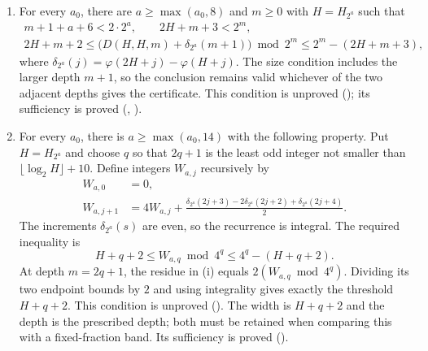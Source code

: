 \begin{enumerate}
\item[(i)] For every $a_0$, there are $a\ge\max(a_0,8)$ and $m\ge0$
with $H=H_{2^a}$ such that
\[
\begin{gathered}
 m+1+a+6<2\cdot2^a,\qquad 2H+m+3<2^m,\\
 2H+m+2\le
 \bigl(D(H,H,m)+\delta_{2^a}(m+1)\bigr)\bmod2^m
 \le2^m-(2H+m+3),
\end{gathered}
\]
where $\delta_{2^a}(j)=\varphi(2H+j)-\varphi(H+j)$.
The size condition includes the larger depth $m+1$, so the conclusion
remains valid whichever of the two adjacent depths gives the certificate.
This condition is unproved
();
its sufficiency is proved
(,
).

\item[(ii)] For every $a_0$, there is $a\ge\max(a_0,14)$ with the
following property. Put $H=H_{2^a}$ and choose $q$ so that $2q+1$ is the
least odd integer not smaller than $\lfloor\log_2H\rfloor+10$.
Define integers $W_{a,j}$ recursively by
\[
\begin{aligned}
 W_{a,0}&=0,\\
 W_{a,j+1}&=4W_{a,j}
  +\frac{\delta_{2^a}(2j+3)-2\delta_{2^a}(2j+2)
                  +\delta_{2^a}(2j+4)}{2}.
\end{aligned}
\]
The increments $\delta_{2^a}(s)$ are even, so the recurrence is integral.
The required inequality is
\[
 H+q+2\le W_{a,q}\bmod4^q\le4^q-(H+q+2).
\]
At depth $m=2q+1$, the residue in (i) equals
$2(W_{a,q}\bmod4^q)$. Dividing its two endpoint bounds by $2$ and using
integrality gives exactly the threshold $H+q+2$.
This condition is unproved
().
The width is $H+q+2$ and the depth is the prescribed depth;
both must be retained when comparing this with a fixed-fraction band. Its
sufficiency is proved
().



\end{enumerate}
